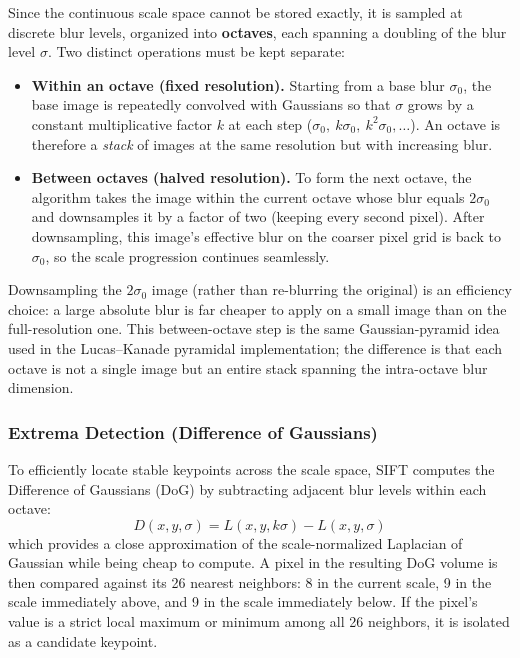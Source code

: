 Since the continuous scale space cannot be stored exactly, it is sampled at discrete blur levels, organized into \textbf{octaves}, each spanning a doubling of the blur level $\sigma$.
Two distinct operations must be kept separate:
\begin{itemize}
    \item \textbf{Within an octave (fixed resolution).} Starting from a base blur $\sigma_0$, the base image is repeatedly convolved with Gaussians so that $\sigma$ grows by a constant multiplicative factor $k$ at each step ($\sigma_0,\ k\sigma_0,\ k^2\sigma_0, \dots$). An octave is therefore a \emph{stack} of images at the same resolution but with increasing blur.
    \item \textbf{Between octaves (halved resolution).} To form the next octave, the algorithm takes the image within the current octave whose blur equals $2\sigma_0$ and downsamples it by a factor of two (keeping every second pixel). After downsampling, this image's effective blur on the coarser pixel grid is back to $\sigma_0$, so the scale progression continues seamlessly.
\end{itemize}
Downsampling the $2\sigma_0$ image (rather than re-blurring the original) is an efficiency choice: a large absolute blur is far cheaper to apply on a small image than on the full-resolution one.
This between-octave step is the same Gaussian-pyramid idea used in the Lucas--Kanade pyramidal implementation; the difference is that each octave is not a single image but an entire stack spanning the intra-octave blur dimension.

\subsubsection{Extrema Detection (Difference of Gaussians)}
To efficiently locate stable keypoints across the scale space, SIFT computes the Difference of Gaussians (DoG) by subtracting adjacent blur levels within each octave:
\begin{equation}
    D(x, y, \sigma) = L(x, y, k\sigma) - L(x, y, \sigma)
\end{equation}
which provides a close approximation of the scale-normalized Laplacian of Gaussian while being cheap to compute.
A pixel in the resulting DoG volume is then compared against its 26 nearest neighbors: 8 in the current scale, 9 in the scale immediately above, and 9 in the scale immediately below.
If the pixel's value is a strict local maximum or minimum among all 26 neighbors, it is isolated as a candidate keypoint.

